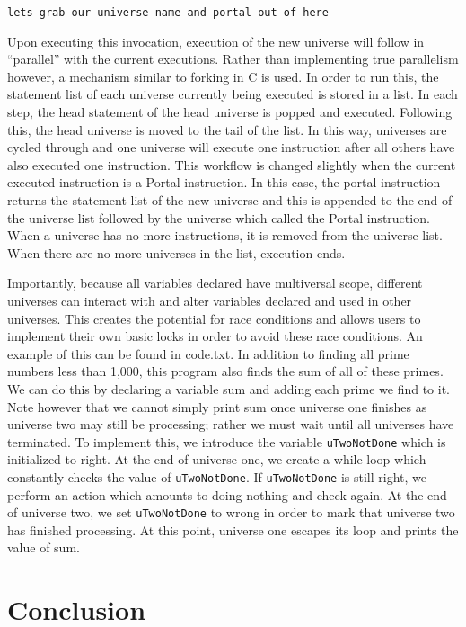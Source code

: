 \documentclass[numbers]{sigplanconf}
\begin{document}
\texttt{lets grab our universe name and portal out of here}

	
Upon executing this invocation, execution of the new universe will follow in “parallel” with the current executions. Rather than implementing true parallelism however, a mechanism similar to forking in C is used. In order to run this, the statement list of each universe currently being executed is stored in a list. In each step, the head statement of the head universe is popped and executed. Following this, the head universe is moved to the tail of the list. In this way, universes are cycled through and one universe will execute one instruction after all others have also executed one instruction. This workflow is changed slightly when the current executed instruction is a Portal instruction. In this case, the portal instruction returns the statement list of the new universe and this is appended to the end of the universe list followed by the universe which called the Portal instruction. When a universe has no more instructions, it is removed from the universe list. When there are no more universes in the list, execution ends.

Importantly, because all variables declared have multiversal scope, different universes can interact with and alter variables declared and used in other universes. This creates the potential for race conditions and allows users to implement their own basic locks in order to avoid these race conditions. An example of this can be found in code.txt. In addition to finding all prime numbers less than 1,000, this program also finds the sum of all of these primes. We can do this by declaring a variable sum and adding each prime we find to it. Note however that we cannot simply print sum once universe one finishes as universe two may still be processing; rather we must wait until all universes have terminated. To implement this, we introduce the variable \texttt{uTwoNotDone} which is initialized to right. At the end of universe one, we create a while loop which constantly checks the value of \texttt{uTwoNotDone}. If \texttt{uTwoNotDone} is still right, we perform an action which amounts to doing nothing and check again. At the end of universe two, we set \texttt{uTwoNotDone} to wrong in order to mark that universe two has finished processing. At this point, universe one escapes its loop and prints the value of sum.


\section{Conclusion}
\end{document}
